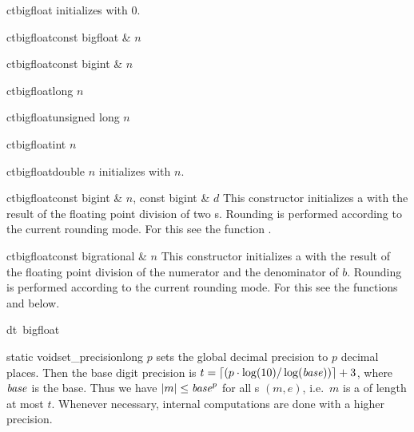 
\CONS

\begin{fcode}{ct}{bigfloat}{}
  initializes with 0.
\end{fcode}

\begin{fcode}{ct}{bigfloat}{const bigfloat & $n$}\end{fcode}
\begin{fcode}{ct}{bigfloat}{const bigint & $n$}\end{fcode}
\begin{fcode}{ct}{bigfloat}{long $n$}\end{fcode}
\begin{fcode}{ct}{bigfloat}{unsigned long $n$}\end{fcode}
\begin{fcode}{ct}{bigfloat}{int $n$}\end{fcode}
\begin{fcode}{ct}{bigfloat}{double $n$}
  initializes with $n$.
\end{fcode}

\begin{fcode}{ct}{bigfloat}{const bigint & $n$, const bigint & $d$}
  This constructor initializes a  with the result of the floating point division
  of two s.  Rounding is performed according to the current rounding mode.  For this
  see the function .
\end{fcode}

\begin{fcode}{ct}{bigfloat}{const bigrational & $n$}
  This constructor initializes a  with the result of the floating point division
  of the numerator and the denominator of $b$.  Rounding is performed according to the current
  rounding mode.  For this see the functions  and  below.
\end{fcode}

\begin{fcode}{dt}{~bigfloat}{}
\end{fcode}



\INIT

\label{bigfloat_init}
\begin{fcode}{static void}{set_precision}{long $p$}
  sets the global decimal precision to $p$ decimal places.  Then the base digit precision is $t
  = \lceil(p\cdot\log(10)/\log(\mathit{base}))\rceil + 3$, where $\mathit{base}$ is the  base.
  Thus we have $|m| \leq \mathit{base}^p$ for all s $(m, e)$, i.e.~$m$ is a 
  of length at most $t$.  Whenever necessary, internal computations are done with a higher
  precision.
\end{fcode}

